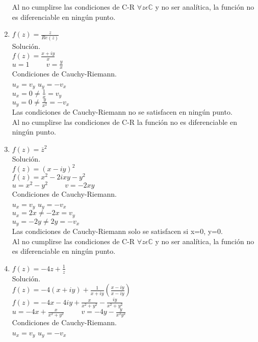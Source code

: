 \documentclass[12pt,letterpaper]{article}
\begin{document}
\begin{enumerate}
Al no cumplirse las condiciones de C-R $\forall z \epsilon \mathbb{C}$ y no ser anal\'itica, la funci\'on no es diferenciable en ning\'un punto.
\item $f(z)= \frac{z}{Re(z)}$\\
Soluci\'on.\\
$f(z)=\frac{x+iy}{x}$\\
$u=1 \hspace{1cm} v=\frac{y}{x}$\\
Condiciones de Cauchy-Riemann.\\
$u_x=v_y$ \hspace{1cm} $u_y=-v_x$\\
$u_x = 0 \neq \frac{1}{x} = v_y$\\
$u_y = 0 \neq \frac{y}{x^2} =-v_x$\\
Las condiciones de Cauchy-Riemann no se satisfacen en ning\'un punto. \\
Al no cumplirse las condiciones de C-R la funci\'on no es diferenciable en ning\'un punto.
\item $f(z)= \overline{z}^2$\\
Soluci\'on.\\
$f(z)=(x-iy)^2$\\
$f(z)=x^2-2ixy-y^2$\\
$u=x^2-y^2 \hspace{1cm} v=-2xy$\\
Condiciones de Cauchy-Riemann.\\
$u_x=v_y$ \hspace{1cm} $u_y=-v_x$\\
$u_x = 2x \neq -2x = v_y$\\
$u_y = -2y \neq 2y =-v_x$\\
Las condiciones de Cauchy-Riemann solo se satisfacen si x=0, y=0. \\
Al no cumplirse las condiciones de C-R $\forall z \epsilon \mathbb{C}$ y no ser anal\'itica, la funci\'on no es diferenciable en ning\'un punto.
\item $f(z)= -4z + \frac{1}{z}$\\
Soluci\'on.\\
$f(z)=-4(x+iy) + \frac{1}{x+iy}(\frac{x-iy}{x-iy})$\\
$f(z)=-4x-4iy + \frac{x}{x^2+y^2}-\frac{iy}{x^2+y^2}$\\
$u=-4x+\frac{x}{x^2+y^2} \hspace{1cm} v=-4y-\frac{y}{x^2y^2}$\\
Condiciones de Cauchy-Riemann.\\
$u_x=v_y$ \hspace{1cm} $u_y=-v_x$\\

\end{enumerate}
\end{document}
